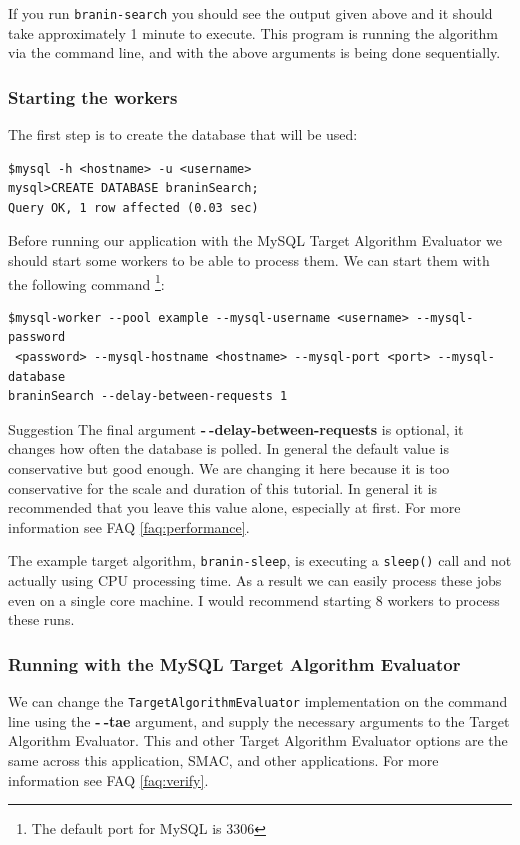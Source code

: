 \documentclass[11pt,letterpaper,oneside]{article}
\begin{document}
If you run \texttt{branin-search} you should see the output given above and it should take approximately 1 minute to execute. This program is running the algorithm via the command line, and with the above arguments is being done sequentially.

\subsubsection{Starting the workers}
\label{start-workers}

\label{running-mysqldbtae}
The first step is to create the database that will be used:
\begin{verbatim}
$mysql -h <hostname> -u <username>
mysql>CREATE DATABASE braninSearch;
Query OK, 1 row affected (0.03 sec)
\end{verbatim}

Before running our application with the MySQL Target Algorithm Evaluator we should start some workers to be able to process them. We can start them with the following command \footnote{The default port for MySQL is 3306}:

\begin{verbatim}
$mysql-worker --pool example --mysql-username <username> --mysql-password
 <password> --mysql-hostname <hostname> --mysql-port <port> --mysql-database
braninSearch --delay-between-requests 1
\end{verbatim}

\begin{bclogo}[logo=\bclampe, couleurBarre=red, noborder=true]{Suggestion}
The final argument \textbf{-$~\!$-delay-between-requests} is optional, it changes how often the database is polled. In general the default value is conservative but good enough. We are changing it here because it is too conservative for the scale and duration of this tutorial. In general it is recommended that you leave this value alone, especially at first. For more information see FAQ \ref{faq:performance}.
\end{bclogo}

The example target algorithm, \texttt{branin-sleep}, is executing a \texttt{sleep()} call and not actually using CPU processing time. As a result we can easily process these jobs even on a single core machine. I would recommend starting 8 workers to process these runs.

\subsubsection{Running with the MySQL Target Algorithm Evaluator}
We can change the \texttt{TargetAlgorithmEvaluator} implementation on the command line using the \textbf{-$~\!$-tae} argument, and supply the necessary arguments to the Target Algorithm Evaluator. This and other Target Algorithm Evaluator options are the same across this application, SMAC, and other applications. For more information see FAQ \ref{faq:verify}.
\end{document}
